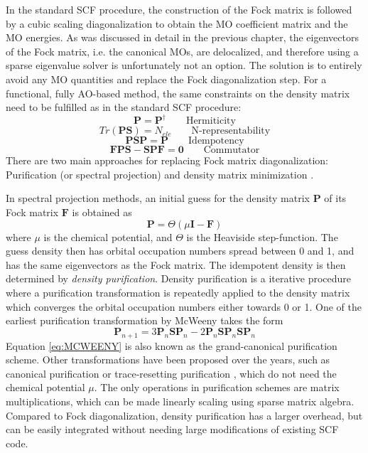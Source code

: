 In the standard SCF procedure, the construction of the Fock matrix is followed by a cubic scaling diagonalization to obtain the MO coefficient matrix and the MO energies. As was discussed in detail in the previous chapter, the eigenvectors of the Fock matrix, i.e. the canonical MOs, are delocalized, and therefore using a sparse eigenvalue solver is unfortunately not an option. The solution is to entirely avoid any MO quantities and replace the Fock diagonalization step. For a functional, fully AO-based method, the same constraints on the density matrix need to be fulfilled as in the standard SCF procedure:
\begin{equation}
\mathbf{P} = \mathbf{P}^{\dagger} \qquad \textrm{Hermiticity}
\end{equation}
\begin{equation}
Tr(\mathbf{PS}) = N_{ele} \qquad \textrm{N-representability}
\end{equation}
\begin{equation}
\mathbf{PSP} = \mathbf{P} \qquad \textrm{Idempotency}
\end{equation}
\begin{equation}
\mathbf{FPS} - \mathbf{SPF} = \mathbf{0} \qquad \textrm{Commutator}
\end{equation}
\noindent There are two main approaches for replacing Fock matrix diagonalization: Purification (or spectral projection) and density matrix minimization \cite{Kim2016}. %

In spectral projection methods, an initial guess for the density matrix $\mathbf{P}$ of its Fock matrix $\mathbf{F}$ is obtained as
\begin{equation}
\mathbf{P} = \Theta \left( \mu \mathbf{I} - \mathbf{F} \right)
\end{equation}
\noindent where $\mu$ is the chemical potential, and $\Theta$ is the Heaviside step-function. The guess density then has orbital occupation numbers spread between 0 and 1, and has the same eigenvectors as the Fock matrix. The idempotent density is then determined by \emph{density purification}. Density purification is a iterative procedure where a purification transformation is repeatedly applied to the density matrix which converges the orbital occupation numbers either towards 0 or 1. One of the earliest purification transformation by McWeeny \cite{McW1959} takes the form
\begin{equation}
\mathbf{P}_{n+1} = 3\mathbf{P}_n\mathbf{SP}_n - 2\mathbf{P}_n\mathbf{SP}_n\mathbf{SP}_n
\label{eq:MCWEENY}
\end{equation}
\noindent Equation \ref{eq:MCWEENY} is also known as the grand-canonical purification scheme. Other transformations have been proposed over the years, such as canonical purification \cite{Pal1998} or trace-resetting purification \cite{Nik2003}, which do not need the chemical potential $\mu$. The only operations in purification schemes are matrix multiplications, which can be made linearly scaling using sparse matrix algebra. Compared to Fock diagonalization, density purification has a larger overhead, but can be easily integrated without needing large modifications of existing SCF code.

